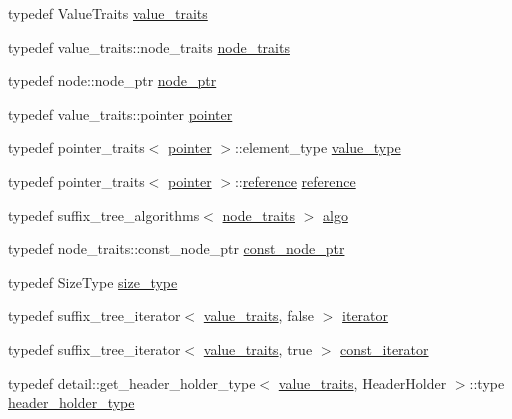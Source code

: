 \begin{DoxyCompactItemize}
\item 
typedef Value\+Traits \hyperlink{classboost_1_1intrusive_1_1suffix__tree__impl_a30d9e164c38c11cd38917ad14e9f3e88}{value\+\_\+traits}
\item 
typedef value\+\_\+traits\+::node\+\_\+traits \hyperlink{classboost_1_1intrusive_1_1suffix__tree__impl_a4fac695b2c8ea16789711a9840af44c4}{node\+\_\+traits}
\item 
typedef node\+::node\+\_\+ptr \hyperlink{classboost_1_1intrusive_1_1suffix__tree__impl_a055e19a35a8268047cec3a6e9341dfca}{node\+\_\+ptr}
\item 
typedef value\+\_\+traits\+::pointer \hyperlink{classboost_1_1intrusive_1_1suffix__tree__impl_af8ad26e95f6cc7ba4a814d02eb8f4320}{pointer}
\item 
typedef pointer\+\_\+traits$<$ \hyperlink{classboost_1_1intrusive_1_1suffix__tree__impl_af8ad26e95f6cc7ba4a814d02eb8f4320}{pointer} $>$\+::element\+\_\+type \hyperlink{classboost_1_1intrusive_1_1suffix__tree__impl_a592893260249dc653dfe9f36ea5d14b6}{value\+\_\+type}
\item 
typedef pointer\+\_\+traits$<$ \hyperlink{classboost_1_1intrusive_1_1suffix__tree__impl_af8ad26e95f6cc7ba4a814d02eb8f4320}{pointer} $>$\+::\hyperlink{classboost_1_1intrusive_1_1suffix__tree__impl_af66898eb8c69a952f6a92f6c6b704bed}{reference} \hyperlink{classboost_1_1intrusive_1_1suffix__tree__impl_af66898eb8c69a952f6a92f6c6b704bed}{reference}
\item 
typedef suffix\+\_\+tree\+\_\+algorithms$<$ \hyperlink{classboost_1_1intrusive_1_1suffix__tree__impl_a4fac695b2c8ea16789711a9840af44c4}{node\+\_\+traits} $>$ \hyperlink{classboost_1_1intrusive_1_1suffix__tree__impl_a3e079dda4e4422ad9c911470f3e8c7e2}{algo}
\item 
typedef node\+\_\+traits\+::const\+\_\+node\+\_\+ptr \hyperlink{classboost_1_1intrusive_1_1suffix__tree__impl_a5cf354495727a0b22948de4115d0a2b8}{const\+\_\+node\+\_\+ptr}
\item 
typedef Size\+Type \hyperlink{classboost_1_1intrusive_1_1suffix__tree__impl_ad98ea23cb22b9adc18366b5d8ab56d9b}{size\+\_\+type}
\item 
typedef suffix\+\_\+tree\+\_\+iterator$<$ \hyperlink{classboost_1_1intrusive_1_1suffix__tree__impl_a30d9e164c38c11cd38917ad14e9f3e88}{value\+\_\+traits}, false $>$ \hyperlink{classboost_1_1intrusive_1_1suffix__tree__impl_a2df3b52dced59346b59db470e93ba87c}{iterator}
\item 
typedef suffix\+\_\+tree\+\_\+iterator$<$ \hyperlink{classboost_1_1intrusive_1_1suffix__tree__impl_a30d9e164c38c11cd38917ad14e9f3e88}{value\+\_\+traits}, true $>$ \hyperlink{classboost_1_1intrusive_1_1suffix__tree__impl_a221fd6a26db0f6aa44951317caa66126}{const\+\_\+iterator}
\item 
typedef detail\+::get\+\_\+header\+\_\+holder\+\_\+type$<$ \hyperlink{classboost_1_1intrusive_1_1suffix__tree__impl_a30d9e164c38c11cd38917ad14e9f3e88}{value\+\_\+traits}, Header\+Holder $>$\+::type \hyperlink{classboost_1_1intrusive_1_1suffix__tree__impl_acb00482132fdd79dc983b313f596e364}{header\+\_\+holder\+\_\+type}
\end{DoxyCompactItemize}
